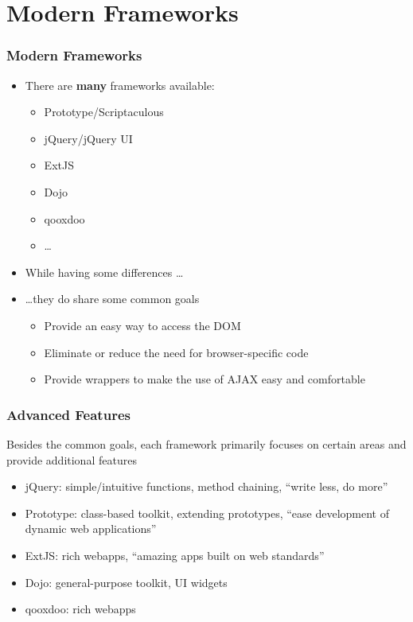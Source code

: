 \documentclass{beamer}
\begin{document}
\section{Modern Frameworks}
\begin{frame}
  \frametitle{Modern Frameworks}
  \begin{itemize}
    \item There are \textbf{many} frameworks available:
    \begin{itemize}
      \item Prototype/Scriptaculous
      \item jQuery/jQuery UI
      \item ExtJS
      \item Dojo
      \item qooxdoo
      \item \ldots
    \end{itemize}
    \item While having some differences \ldots
    \item \ldots they do share some common goals
    \begin{itemize}
      \item Provide an easy way to access the DOM
      \item Eliminate or reduce the need for browser-specific code
      \item Provide wrappers to make the use of AJAX easy and comfortable
    \end{itemize}
  \end{itemize}
\end{frame}

\begin{frame}
  \frametitle{Advanced Features}
  Besides the common goals, each framework primarily focuses on certain areas and provide additional
  features
  \begin{itemize}
    \item jQuery: simple/intuitive functions, method chaining, \enquote{write less, do more}
    \item Prototype: class-based toolkit, extending prototypes, \enquote{ease development of
      dynamic web applications}
    \item ExtJS: rich webapps, \enquote{amazing apps built on web standards}
    \item Dojo: general-purpose toolkit, UI widgets
    \item qooxdoo: rich webapps
  \end{itemize}
\end{frame}
\end{document}
